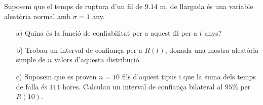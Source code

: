 \begin{probres}
{
Suposem que el temps de ruptura d'un fil de $9.14$ m. de llargada \'es una
variable aleat\`oria normal amb $\sigma =1$ any.
\begin{itemize}
\item[a)]{Quina \'es la funci\'o de confiabilitat per a aquest fil per a $t$ anys?}
\item[b)]{Trobau un interval de confian\c{c}a per a $R(t)$, donada una mostra aleat\`oria simple de $n$
valors d'aquesta distribuci\'o.}
\item[c)]{Suposem que es proven $n=10$ fils d'aquest tipus i que la suma dels
temps de falla \'es $111$ hores. 
Calculau un interval de confian\c{c}a bilateral al
$95\%$ per $R(10)$.}
\end{itemize}
}
\end{probres}

